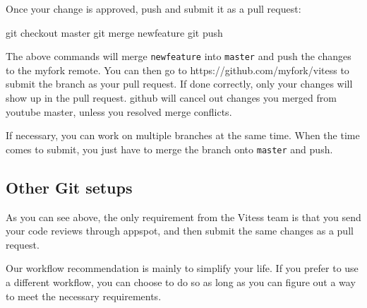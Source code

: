 Once your change is approved, push and submit it as a pull request:

\begin{codesample2}
  git checkout master
  git merge newfeature
  git push
\end{codesample2}




The above commands will merge {\tt newfeature} into {\tt master} and push the changes to the myfork remote.
You can then go to https://github.com/myfork/vitess to submit the branch as your pull request.
If done correctly, only your changes will show up in the pull request.
github will cancel out changes you merged from youtube master, unless you resolved merge conflicts.

If necessary, you can work on multiple branches at the same time.
When the time comes to submit, you just have to merge the branch onto {\tt master} and push.

\subsection{Other Git setups}\hypertarget{other-git-setups}{}\label{other-git-setups}

As you can see above, the only requirement from the Vitess team is that you send
your code reviews through appspot, and then submit the same changes as a pull
request.

Our workflow recommendation is mainly to simplify your life. If you prefer to
use a different workflow, you can choose to do so as long as you can figure out
a way to meet the necessary requirements.

